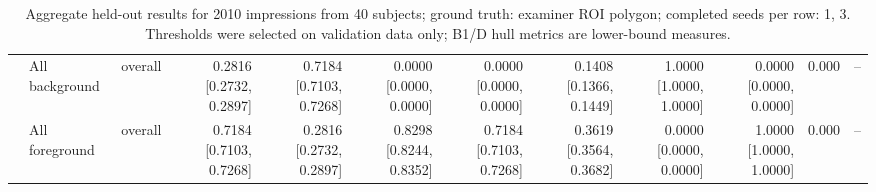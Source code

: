 \begin{table}[t]
\begin{tabular}{lllrrrrrrrrr}
 & All background & overall & 0.2816 [0.2732, 0.2897] & 0.7184 [0.7103, 0.7268] & 0.0000 [0.0000, 0.0000] & 0.0000 [0.0000, 0.0000] & 0.1408 [0.1366, 0.1449] & 1.0000 [1.0000, 1.0000] & 0.0000 [0.0000, 0.0000] & 0.000 & -- \\
 & All foreground & overall & 0.7184 [0.7103, 0.7268] & 0.2816 [0.2732, 0.2897] & 0.8298 [0.8244, 0.8352] & 0.7184 [0.7103, 0.7268] & 0.3619 [0.3564, 0.3682] & 0.0000 [0.0000, 0.0000] & 1.0000 [1.0000, 1.0000] & 0.000 & -- \\
\bottomrule
\end{tabular}
\caption{Aggregate held-out results for 2010 impressions from 40 subjects; ground truth: examiner ROI polygon; completed seeds per row: 1, 3. Thresholds were selected on validation data only; B1/D hull metrics are lower-bound measures.}
\end{table}
